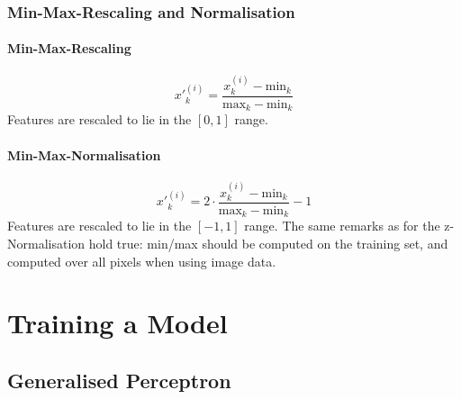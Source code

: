 \documentclass[11pt]{article}
\begin{document}
\subsubsection{Min-Max-Rescaling and Normalisation}
\paragraph{Min-Max-Rescaling}
\begin{equation*}
	{x'}_k^{(i)} = \frac{x_k^{(i)}-\text{min}_k}{\text{max}_k -\text{min}_k}
\end{equation*}
\noindent
Features are rescaled to lie in the $[0,1]$ range.

\paragraph{Min-Max-Normalisation}
\begin{equation*}
{x'}_k^{(i)} = 2\cdot\frac{x_k^{(i)}-\text{min}_k}{\text{max}_k -\text{min}_k} - 1
\end{equation*}
\noindent
Features are rescaled to lie in the $[-1,1]$ range.
\vspace{1em}
\noindent
The same remarks as for the z-Normalisation hold true: min/max should be computed on the training set, and computed over all pixels when using image data.

\section{Training a Model}

\subsection{Generalised Perceptron}
\end{document}

